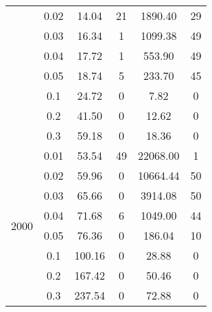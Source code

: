 \begin{tabular}{| c | c | c | c | c | c | }
	\cline{2-6}
	& 0.02 & 14.04 & 21 & 1890.40 & 29\\
	\cline{2-6}
	& 0.03 & 16.34 & 1 & 1099.38 & 49\\
	\cline{2-6}
	& 0.04 & 17.72 & 1 & 553.90 & 49\\
	\cline{2-6}
	& 0.05 & 18.74 & 5 & 233.70 & 45\\
	\cline{2-6}
	& 0.1 & 24.72 & 0 & 7.82 & 0\\
	\cline{2-6}
	& 0.2 & 41.50 & 0 & 12.62 & 0\\
	\cline{2-6}
	& 0.3 & 59.18 & 0 & 18.36 & 0\\
	\hline
	\multirow{8}{*}{2000} & 0.01 & 53.54 & 49 & 22068.00 & 1\\
	\cline{2-6}
	& 0.02 & 59.96 & 0 & 10664.44 & 50\\
	\cline{2-6}
	& 0.03 & 65.66 & 0 & 3914.08 & 50\\
	\cline{2-6}
	& 0.04 & 71.68 & 6 & 1049.00 & 44\\
	\cline{2-6}
	& 0.05 & 76.36 & 0 & 186.04 & 10\\
	\cline{2-6}
	& 0.1 & 100.16 & 0 & 28.88 & 0\\
	\cline{2-6}
	& 0.2 & 167.42 & 0 & 50.46 & 0\\
	\cline{2-6}
	& 0.3 & 237.54 & 0 & 72.88 & 0\\
	\hline
\end{tabular}